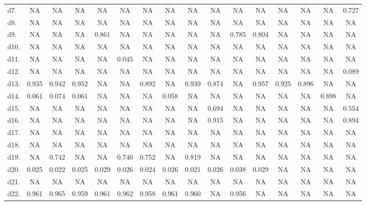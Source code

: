 \begin{table}
\begin{tabular}{lccccccccccccccc}
d7. & NA    & NA    & NA    & NA    & NA    & NA    & NA    & NA    & NA    & NA    & NA    & NA    & NA    & NA    & 0.727 \\
d8. & NA    & NA    & NA    & NA    & NA    & NA    & NA    & NA    & NA    & NA    & NA    & NA    & NA    & NA    & NA \\
d9. & NA    & NA    & NA    & 0.861 & NA    & NA    & NA    & NA    & NA    & 0.785 & 0.804 & NA    & NA    & NA    & NA \\
d10. & NA    & NA    & NA    & NA    & NA    & NA    & NA    & NA    & NA    & NA    & NA    & NA    & NA    & NA    & NA \\
d11. & NA    & NA    & NA    & NA    & 0.045 & NA    & NA    & NA    & NA    & NA    & NA    & NA    & NA    & NA    & NA \\
d12. & NA    & NA    & NA    & NA    & NA    & NA    & NA    & NA    & NA    & NA    & NA    & NA    & NA    & NA    & 0.089 \\
d13. & 0.935 & 0.942 & 0.952 & NA    & NA    & 0.892 & NA    & 0.939 & 0.874 & NA    & 0.957 & 0.925 & 0.896 & NA    & NA \\
d14. & 0.061 & 0.074 & 0.061 & NA    & NA    & NA    & 0.058 & NA    & NA    & NA    & NA    & NA    & NA    & 0.898 & NA \\
d15. & NA    & NA    & NA    & NA    & NA    & NA    & NA    & NA    & 0.694 & NA    & NA    & NA    & NA    & NA    & 0.554 \\
d16. & NA    & NA    & NA    & NA    & NA    & NA    & NA    & NA    & 0.915 & NA    & NA    & NA    & NA    & NA    & 0.894 \\
d17. & NA    & NA    & NA    & NA    & NA    & NA    & NA    & NA    & NA    & NA    & NA    & NA    & NA    & NA    & NA \\
d18. & NA    & NA    & NA    & NA    & NA    & NA    & NA    & NA    & NA    & NA    & NA    & NA    & NA    & NA    & NA \\
d19. & NA    & 0.742 & NA    & NA    & 0.740 & 0.752 & NA    & 0.819 & NA    & NA    & NA    & NA    & NA    & NA    & NA \\
d20. & 0.025 & 0.022 & 0.025 & 0.029 & 0.026 & 0.024 & 0.026 & 0.021 & 0.026 & 0.038 & 0.029 & NA    & NA    & NA    & NA \\
d21. & NA    & NA    & NA    & NA    & NA    & NA    & NA    & NA    & NA    & NA    & NA    & NA    & NA    & NA    & NA \\
d22. & 0.961 & 0.965 & 0.959 & 0.961 & 0.962 & 0.958 & 0.961 & 0.960 & NA    & 0.956 & NA    & NA    & NA    & NA    & NA \\

\end{tabular}
\end{table}
